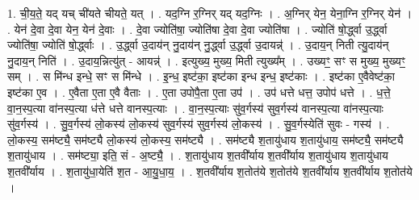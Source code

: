 \documentclass[17pt]{extarticle}
\begin{document}
1. ची॒य॒ते॒ यद् यच् ची॑यते चीयते॒ यत् । . यद॒ग्नि र॒ग्निर् यद् यद॒ग्निः । . अ॒ग्निर् येन॒ येना॒ग्नि र॒ग्निर् येन॑ । . येन॑ दे॒वा दे॒वा येन॒ येन॑ दे॒वाः । . दे॒वा ज्योति॑षा॒ ज्योति॑षा दे॒वा दे॒वा ज्योति॑षा । . ज्योति॑ षो॒र्द्ध्वा उ॒र्द्ध्वा ज्योति॑षा॒ ज्योति॑ षो॒र्द्ध्वाः । . उ॒र्द्ध्वा उ॒दाय॑न् नु॒दाय॑न् नु॒र्द्ध्वा उ॒र्द्ध्वा उ॒दायन्न्॑ । . उ॒दाय॒न् निती त्यु॒दाय॑न् नु॒दाय॒न् निति॑ । . उ॒दाय॒न्नित्यु॑त् - आयन्न्॑ । . इत्युख्य॒ मुख्य॒ मिती त्युख्य᳚म् । . उख्यꣳ॒॒ सꣳ स मुख्य॒ मुख्यꣳ॒॒ सम् । . स मि॑न्ध इन्धे॒ सꣳ स मि॑न्धे । . इ॒न्ध॒ इष्ट॑का॒ इष्ट॑का इन्ध इन्ध॒ इष्ट॑काः । . इष्ट॑का ए॒वैवेष्ट॑का॒ इष्ट॑का ए॒व । . ए॒वैता ए॒ता ए॒वै वैताः । . ए॒ता उपोपै॒ता ए॒ता उप॑ । . उप॑ धत्ते धत्त॒ उपोप॑ धत्ते । . ध॒त्ते॒ वा॒न॒स्प॒त्या वा॑नस्प॒त्या ध॑त्ते धत्ते वानस्प॒त्याः । . वा॒न॒स्प॒त्याः सु॑व॒र्गस्य॑ सुव॒र्गस्य॑ वानस्प॒त्या वा॑नस्प॒त्याः सु॑व॒र्गस्य॑ । . सु॒व॒र्गस्य॑ लो॒कस्य॑ लो॒कस्य॑ सुव॒र्गस्य॑ सुव॒र्गस्य॑ लो॒कस्य॑ । . सु॒व॒र्गस्येति॑ सुवः - गस्य॑ । . लो॒कस्य॒ सम॑ष्ट्यै॒ सम॑ष्ट्यै लो॒कस्य॑ लो॒कस्य॒ सम॑ष्ट्यै । . सम॑ष्ट्यै श॒तायु॑धाय श॒तायु॑धाय॒ सम॑ष्ट्यै॒ सम॑ष्ट्यै श॒तायु॑धाय । . सम॑ष्ट्या॒ इति॒ सं - अ॒ष्ट्यै॒ । . श॒तायु॑धाय श॒तवी᳚र्याय श॒तवी᳚र्याय श॒तायु॑धाय श॒तायु॑धाय श॒तवी᳚र्याय । . श॒तायु॑धा॒येति॑ श॒त - आ॒यु॒धा॒य॒ । . श॒तवी᳚र्याय श॒तोत॑ये श॒तोत॑ये श॒तवी᳚र्याय श॒तवी᳚र्याय श॒तोत॑ये । \newline
\end{document}
